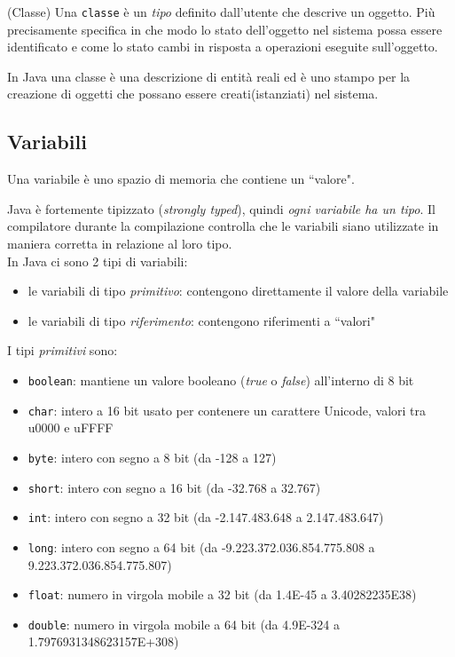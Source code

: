 \documentclass{article}
\begin{document}
\begin{mydef} (Classe) Una \texttt{classe} è un \emph{tipo} 
definito dall'utente che descrive un oggetto.
Più precisamente specifica in che modo lo stato dell'oggetto nel sistema possa essere identificato e come lo stato cambi in risposta a operazioni eseguite sull'oggetto.
\end{mydef}
In Java una classe è una descrizione di entità reali ed è uno stampo per la creazione di oggetti che possano essere creati(istanziati) nel sistema.

\subsection{Variabili}
\begin{mydef} Una variabile è uno spazio di memoria che contiene un ``valore". 
\end{mydef}
Java è fortemente tipizzato (\emph{strongly typed}), quindi \emph{ogni variabile ha un tipo}. Il compilatore durante la compilazione controlla che le variabili siano utilizzate in maniera corretta in relazione al loro tipo.\\

In Java ci sono 2 tipi di variabili:
\begin{itemize}
\item le variabili di tipo \emph{primitivo}: contengono direttamente il valore della variabile
\item le variabili di tipo \emph{riferimento}: contengono riferimenti a ``valori" 
\end{itemize}

I tipi \emph{primitivi} sono:

	\begin{itemize}
		\item \texttt{boolean}: mantiene un valore booleano (\emph{true} o \emph{false}) all'interno di 8 bit
		\item \texttt{char}: intero a 16 bit usato per contenere un carattere Unicode, valori tra u0000 e uFFFF
		\item \texttt{byte}: intero con segno a 8 bit (da -128 a 127)
		\item \texttt{short}: intero con segno a 16 bit (da -32.768 a 32.767)
		\item \texttt{int}: intero con segno a 32 bit (da -2.147.483.648 a 2.147.483.647)
		\item \texttt{long}: intero con segno a 64 bit (da -9.223.372.036.854.775.808 a 9.223.372.036.854.775.807)
		\item \texttt{float}: numero in virgola mobile a 32 bit (da 1.4E-45 a 3.40282235E38)
		\item \texttt{double}: numero in virgola mobile a 64 bit (da 4.9E-324 a 1.7976931348623157E+308)
	\end{itemize}
\end{document}
